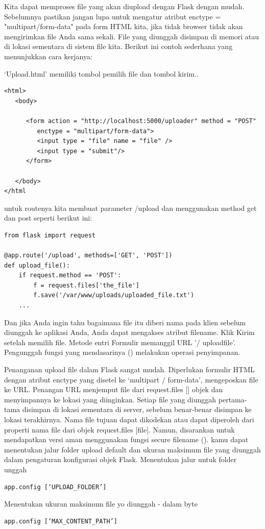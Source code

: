 Kita dapat memproses file yang akan diupload dengan Flask dengan mudah. Sebelumnya pastikan jangan lupa untuk mengatur atribut enctype = "multipart/form-data" pada form HTML kita, jika tidak browser tidak akan mengirimkan file Anda sama sekali. File yang diunggah disimpan di memori atau di lokasi sementara di sistem file kita. Berikut ini contoh sederhana yang menunjukkan cara kerjanya:

‘Upload.html’ memiliki tombol pemilih file dan tombol kirim..
\begin{verbatim}
<html>
   <body>
   
      <form action = "http://localhost:5000/uploader" method = "POST" 
         enctype = "multipart/form-data">
         <input type = "file" name = "file" />
         <input type = "submit"/>
      </form>
      
   </body>
</html
\end{verbatim}
untuk routenya kita membuat parameter /upload dan menggunakan method get dan post seperti berikut ini:

\begin{verbatim}
from flask import request

@app.route('/upload', methods=['GET', 'POST'])
def upload_file():
    if request.method == 'POST':
        f = request.files['the_file']
        f.save('/var/www/uploads/uploaded_file.txt')
    ...
\end{verbatim}
Dan jika Anda ingin tahu bagaimana file itu diberi nama pada klien sebelum diunggah ke aplikasi Anda, Anda dapat mengakses atribut filename.
Klik Kirim setelah memilih file. Metode entri Formulir memanggil URL '/ uploadfile'. Pengunggah fungsi yang mendasarinya () melakukan operasi penyimpanan.

Penanganan upload file dalam Flask sangat mudah. Diperlukan formulir HTML dengan atribut enctype yang disetel ke ‘multipart / form-data’, mengeposkan file ke URL. Penangan URL menjemput file dari request.files [] objek dan menyimpannya ke lokasi yang diinginkan.
	Setiap file yang diunggah pertama-tama disimpan di lokasi sementara di server, sebelum benar-benar disimpan ke lokasi terakhirnya. Nama file tujuan dapat dikodekan atau dapat diperoleh dari properti nama file dari objek request.files [file]. Namun, disarankan untuk mendapatkan versi aman menggunakan fungsi secure filename ().
kamu dapat menentukan jalur folder upload default dan ukuran maksimum file yang diunggah dalam pengaturan konfigurasi objek Flask.
Menentukan jalur untuk folder unggah
\begin{verbatim}
app.config [‘UPLOAD_FOLDER’] 
\end{verbatim}
Menentukan ukuran maksimum file yo diunggah - dalam byte
\begin{verbatim}
app.config [‘MAX_CONTENT_PATH’] 
\end{verbatim}



